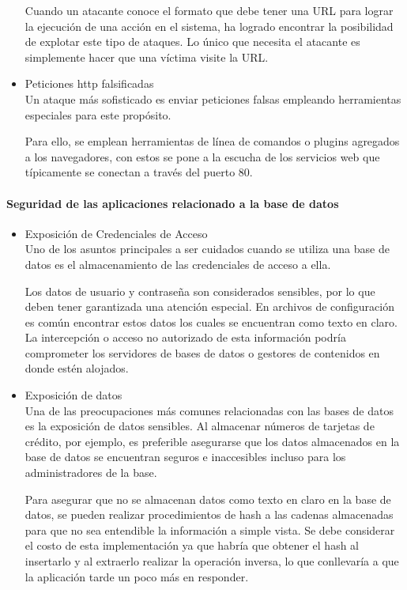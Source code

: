 \documentclass[12pt, a4paper, titlepage]{article}
\begin{document}
\begin{itemize}
        Cuando un atacante conoce el formato que debe tener una URL para lograr la ejecución de una acción en el sistema, ha logrado encontrar la posibilidad de explotar este tipo de ataques. Lo único que necesita el atacante es simplemente hacer que una víctima visite la URL.
		
		\item Peticiones \acrshort{http} falsificadas\\
		Un ataque más sofisticado es enviar peticiones falsas empleando herramientas especiales para este propósito.

        Para ello, se emplean herramientas de línea de comandos o plugins agregados a los navegadores, con estos se pone a la escucha de los servicios web que típicamente se conectan a través del puerto 80.
		\end{itemize}
		
		\paragraph{Seguridad de las aplicaciones relacionado a la base de datos} 
		\begin{itemize}
		    \item Exposición de Credenciales de Acceso \\
		    Uno de los asuntos principales a ser cuidados cuando se utiliza una base de datos es el almacenamiento de las credenciales de acceso a ella.

            Los datos de usuario y contraseña son considerados sensibles, por lo que deben tener garantizada una atención especial. En archivos de configuración es común encontrar estos datos los cuales se encuentran como texto en claro.
            La intercepción o acceso no autorizado de esta información podría comprometer los servidores de bases de datos o  gestores de contenidos en donde estén alojados. 
            
            \item Exposición de datos \\
            Una de las preocupaciones más comunes relacionadas con las bases de datos es la exposición de datos sensibles. Al almacenar números de tarjetas de crédito, por ejemplo, es preferible asegurarse que los datos almacenados en la base de datos se encuentran seguros e inaccesibles incluso para los administradores de la base.

            Para asegurar que no se almacenan datos como texto en claro en la base de datos, se pueden realizar procedimientos de hash a las cadenas almacenadas para que no sea entendible la información a simple vista. Se debe considerar el costo de esta implementación ya que habría que obtener el hash al insertarlo y al extraerlo realizar la operación inversa, lo que conllevaría a que la aplicación tarde un poco más en responder.
            
		\end{itemize}
		
\end{document}
